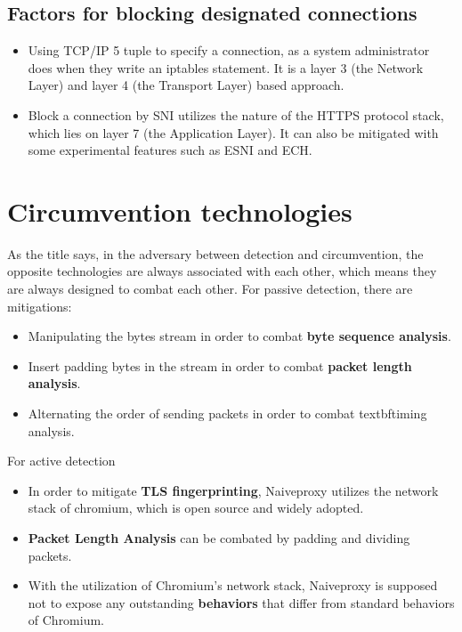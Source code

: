 \subsection{Factors for blocking designated connections}
\begin{frame}
    \begin{itemize}
        \item Using TCP/IP 5 tuple to specify a connection, as a system administrator does when they write an iptables statement. It is a layer 3 (the Network Layer) and layer 4 (the Transport Layer) based approach.
        \item Block a connection by SNI utilizes the nature of the HTTPS protocol stack, which lies on layer 7 (the Application Layer). It can also be mitigated with some experimental features such as ESNI and ECH.
    \end{itemize}
\end{frame}

\section{Circumvention technologies}
\begin{frame}
    As the title says, in the adversary between detection and circumvention, the opposite technologies are always associated with each other, which means they are always designed to combat each other.
    For passive detection, there are mitigations:
    \begin{itemize}
    \item Manipulating the bytes stream in order to combat \textbf{byte sequence analysis}.
    \item Insert padding bytes in the stream in order to combat \textbf{packet length analysis}.
    \item Alternating the order of sending packets in order to combat textbf{timing analysis}.
    \end{itemize}

    For active detection
    \begin{itemize}
    \item In order to mitigate \textbf{TLS fingerprinting}, Naiveproxy utilizes the network stack of chromium, which is open source and widely adopted.
    \item \textbf{Packet Length Analysis} can be combated by padding and dividing packets.
    \item  With the utilization of Chromium's network stack, Naiveproxy is supposed not to expose any outstanding \textbf{behaviors} that differ from standard behaviors of Chromium.
\end{itemize}

\end{frame}


